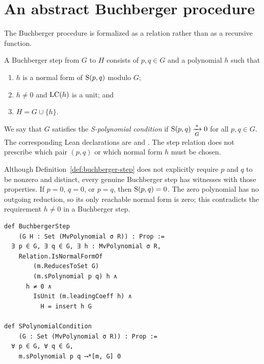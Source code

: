 \section{An abstract Buchberger procedure}\label{sec:buchberger-procedure}

The Buchberger procedure is formalized as a relation rather than as a recursive function.

\begin{definition}
\label{def:buchberger-step}
A Buchberger step from $G$ to $H$ consists of $p,q\in G$ and a polynomial $h$
such that
\begin{enumerate}[label=(\roman*),leftmargin=2em]
  \item $h$ is a normal form of $\operatorname{S}(p,q)$ modulo $G$;
  \item $h\neq0$ and $\operatorname{LC}(h)$ is a unit; and
  \item $H=G\cup\{h\}$.
\end{enumerate}
We say that $G$ satisfies the \emph{S-polynomial condition} if
$\operatorname{S}(p,q)\xrightarrow[G]{*}0$ for all $p,q\in G$.  The corresponding Lean
declarations are
and
.
The step relation does not prescribe
which pair $(p,q)$ or which normal form $h$ must be chosen.
\end{definition}

Although Definition~\ref{def:buchberger-step} does not explicitly require
$p$ and $q$ to be nonzero and distinct, every genuine Buchberger step has
witnesses with those properties.  If $p=0$, $q=0$, or $p=q$, then
$\operatorname{S}(p,q)=0$.  The zero polynomial has no outgoing reduction, so its only
reachable normal form is zero; this contradicts the requirement $h\neq0$ in a
Buchberger step.

\begin{lstlisting}[float=htbp,style=lean,caption={The nondeterministic Buchberger step relation.},label={lst:buchberger-step}]
def BuchbergerStep
    (G H : Set (MvPolynomial σ R)) : Prop :=
  ∃ p ∈ G, ∃ q ∈ G, ∃ h : MvPolynomial σ R,
    Relation.IsNormalFormOf
        (m.ReducesToSet G)
        (m.sPolynomial p q) h ∧
      h ≠ 0 ∧
        IsUnit (m.leadingCoeff h) ∧
          H = insert h G

def SPolynomialCondition
    (G : Set (MvPolynomial σ R)) : Prop :=
  ∀ p ∈ G, ∀ q ∈ G,
    m.sPolynomial p q ⟶*[m, G] 0
\end{lstlisting}

